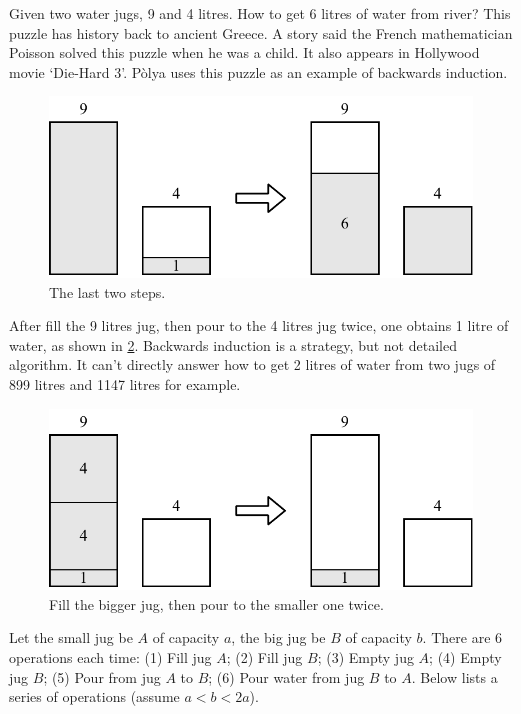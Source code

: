 \documentclass[b5paper]{article}
\begin{document}
Given two water jugs, 9 and 4 litres. How to get 6 litres of water from river? This puzzle has history back to ancient Greece. A story said the French mathematician Poisson solved this puzzle when he was a child. It also appears in Hollywood movie `Die-Hard 3'. P\`{o}lya uses this puzzle as an example of backwards induction\cite{how-to-solve-it}.

\begin{figure}[htbp]
 \centering
 \includegraphics[scale=0.5]{img/jugs-last}
 \caption{The last two steps.}
 \label{fig:jugs-r1}
\end{figure}

After fill the 9 litres jug, then pour to the 4 litres jug twice, one obtains 1 litre of water, as shown in \cref{fig:jugs-r2}. Backwards induction is a strategy, but not detailed algorithm. It can't directly answer how to get 2 litres of water from two jugs of 899 litres and 1147 litres for example.

\begin{figure}[htbp]
 \centering
 \includegraphics[scale=0.5]{img/jugs-last-two}
 \caption{Fill the bigger jug, then pour to the smaller one twice.}
 \label{fig:jugs-r2}
\end{figure}

Let the small jug be $A$ of capacity $a$, the big jug be $B$ of capacity $b$. There are 6 operations each time: (1) Fill jug $A$; (2) Fill jug $B$; (3) Empty jug $A$; (4) Empty jug $B$; (5) Pour from jug $A$ to $B$; (6) Pour water from jug $B$ to $A$. Below lists a series of operations (assume $a < b < 2a$).
\end{document}
